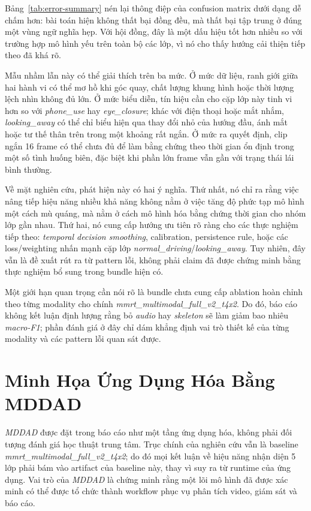 \documentclass[conference,a4paper]{IEEEtran}
\begin{document}
Bảng~\ref{tab:error-summary} nén lại thông điệp của confusion matrix dưới dạng dễ chấm hơn: bài toán hiện không thất bại đồng đều, mà thất bại tập trung ở đúng một vùng ngữ nghĩa hẹp. Với hội đồng, đây là một dấu hiệu tốt hơn nhiều so với trường hợp mô hình yếu trên toàn bộ các lớp, vì nó cho thấy hướng cải thiện tiếp theo đã khá rõ.

Mẫu nhầm lẫn này có thể giải thích trên ba mức. Ở mức dữ liệu, ranh giới giữa hai hành vi có thể mơ hồ khi góc quay, chất lượng khung hình hoặc thời lượng lệch nhìn không đủ lớn. Ở mức biểu diễn, tín hiệu cần cho cặp lớp này tinh vi hơn so với \textit{phone\_use} hay \textit{eye\_closure}; khác với điện thoại hoặc mắt nhắm, \textit{looking\_away} có thể chỉ biểu hiện qua thay đổi nhỏ của hướng đầu, ánh mắt hoặc tư thế thân trên trong một khoảng rất ngắn. Ở mức ra quyết định, clip ngắn 16 frame có thể chưa đủ để làm bằng chứng theo thời gian ổn định trong một số tình huống biên, đặc biệt khi phần lớn frame vẫn gần với trạng thái lái bình thường.

Về mặt nghiên cứu, phát hiện này có hai ý nghĩa. Thứ nhất, nó chỉ ra rằng việc nâng tiếp hiệu năng nhiều khả năng không nằm ở việc tăng độ phức tạp mô hình một cách mù quáng, mà nằm ở cách mô hình hóa bằng chứng thời gian cho nhóm lớp gần nhau. Thứ hai, nó cung cấp hướng ưu tiên rõ ràng cho các thực nghiệm tiếp theo: \textit{temporal decision smoothing}, calibration, persistence rule, hoặc các loss/weighting nhấn mạnh cặp lớp \textit{normal\_driving}/\textit{looking\_away}. Tuy nhiên, đây vẫn là đề xuất rút ra từ pattern lỗi, không phải claim đã được chứng minh bằng thực nghiệm bổ sung trong bundle hiện có.

Một giới hạn quan trọng cần nói rõ là bundle chưa cung cấp ablation hoàn chỉnh theo từng modality cho chính \textit{mmrt\_multimodal\_full\_v2\_t4x2}. Do đó, báo cáo không kết luận định lượng rằng bỏ \textit{audio} hay \textit{skeleton} sẽ làm giảm bao nhiêu \textit{macro-F1}; phần đánh giá ở đây chỉ dám khẳng định vai trò thiết kế của từng modality và các pattern lỗi quan sát được.

\section[Tang Ung Dung Hoa MDDAD]{Minh Họa Ứng Dụng Hóa Bằng MDDAD}
\textit{MDDAD} được đặt trong báo cáo như một tầng ứng dụng hóa, không phải đối tượng đánh giá học thuật trung tâm. Trục chính của nghiên cứu vẫn là baseline \textit{mmrt\_multimodal\_full\_v2\_t4x2}; do đó mọi kết luận về hiệu năng nhận diện 5 lớp phải bám vào artifact của baseline này, thay vì suy ra từ runtime của ứng dụng. Vai trò của \textit{MDDAD} là chứng minh rằng một lõi mô hình đã được xác minh có thể được tổ chức thành workflow phục vụ phân tích video, giám sát và báo cáo.
\end{document}
